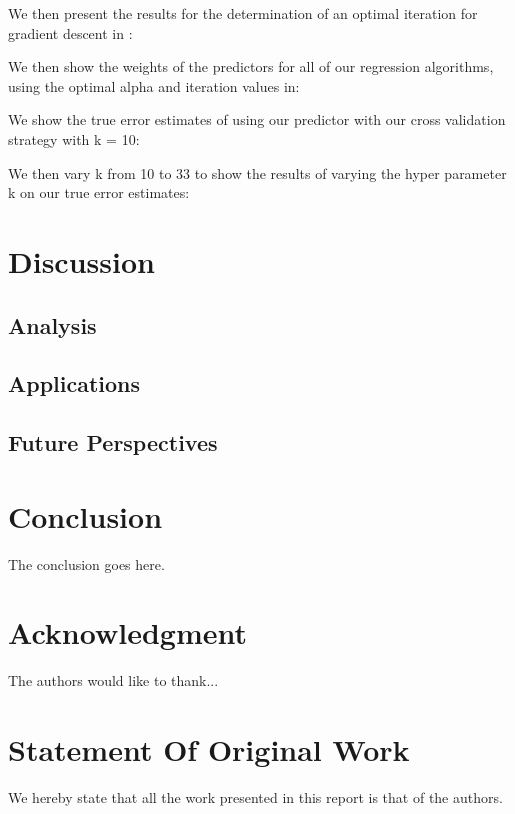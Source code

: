 \documentclass[conference]{IEEEtran}
\begin{document}
We then present the results for the determination of an optimal iteration for gradient descent in : 


We then show the weights of the predictors for all of our regression algorithms, using the optimal alpha and 
iteration values in:


We show the true error estimates of using our predictor with our cross validation strategy with k = 10: 


We then vary k from 10 to 33 to show the results of varying the hyper parameter k on our true error estimates: 


\section{Discussion}

\subsection{Analysis}

\subsection{Applications}

\subsection{Future Perspectives}



\section{Conclusion}
The conclusion goes here. \cite{kopka}
\section*{Acknowledgment}


The authors would like to thank...

\section*{Statement Of Original Work}

We hereby state that all the work presented in 
this report is that of the authors.
\end{document}
